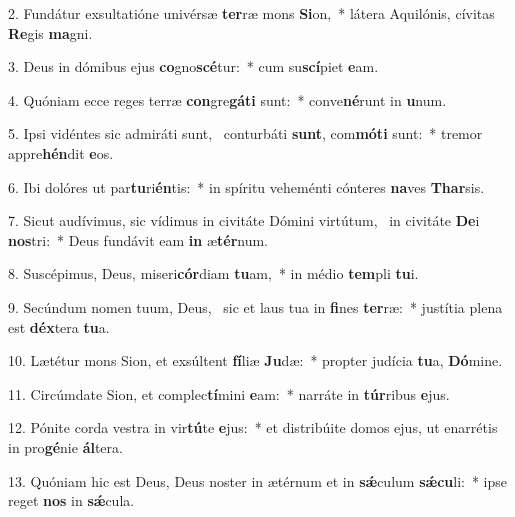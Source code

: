 2. Fundátur exsultatióne univérsæ \textbf{ter}ræ mons \textbf{Si}on,~*  látera Aquilónis, cívitas \textbf{Re}gis \textbf{ma}gni.\

3. Deus in dómibus ejus \textbf{co}gno\textbf{scé}tur:~*  cum su\textbf{scí}piet \textbf{e}am.\

4. Quóniam ecce reges terræ \textbf{con}gre\textbf{gá}\textbf{ti} sunt:~*  conve\textbf{né}runt in \textbf{u}num.\

5. Ipsi vidéntes sic admiráti sunt, \dag\  conturbáti \textbf{sunt}, com\textbf{mó}\textbf{ti} sunt:~*  tremor appre\textbf{hén}dit \textbf{e}os.\

6. Ibi dolóres ut par\textbf{tu}ri\textbf{én}tis:~*  in spíritu veheménti cónteres \textbf{na}ves \textbf{Thar}sis.\

7. Sicut audívimus, sic vídimus in civitáte Dómini virtútum, \dag\  in civitáte \textbf{De}i \textbf{nos}tri:~*  Deus fundávit eam \textbf{in} æ\textbf{tér}num.\

8. Suscépimus, Deus, miseri\textbf{cór}diam \textbf{tu}am,~*  in médio \textbf{tem}pli \textbf{tu}i.\

9. Secúndum nomen tuum, Deus, \dag\  sic et laus tua in \textbf{fi}nes \textbf{ter}ræ:~*  justítia plena est \textbf{déx}tera \textbf{tu}a.\

10. Lætétur mons Sion, et exsúltent \textbf{fí}liæ \textbf{Ju}dæ:~*  propter judícia \textbf{tu}a, \textbf{Dó}mine.\

11. Circúmdate Sion, et complec\textbf{tí}mini \textbf{e}am:~*  narráte in \textbf{túr}ribus \textbf{e}jus.\

12. Pónite corda vestra in vir\textbf{tú}te \textbf{e}jus:~*  et distribúite domos ejus, ut enarrétis in pro\textbf{gé}nie \textbf{ál}tera.\

13. Quóniam hic est Deus, Deus noster in ætérnum et in \textbf{sǽ}culum \textbf{sǽ}\textbf{cu}li:~*  ipse reget \textbf{nos} in \textbf{sǽ}cula.\

